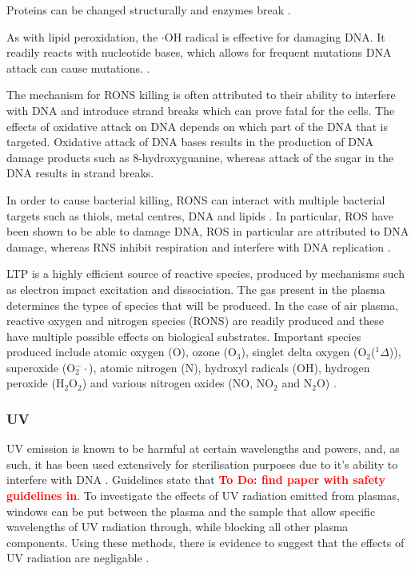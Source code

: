\documentclass[11pt, oneside]{article}   	%
\newcommand{\todo}[1]{ \textcolor{red}{\bf{To Do:} #1}}
\begin{document}
Proteins can be changed structurally and enzymes break \cite{PhamHuy2008free}.

As with lipid peroxidation, the $\cdot$OH radical is effective for damaging DNA. 
It readily reacts with nucleotide bases, which allows for frequent mutations 
DNA attack can cause mutations. \cite{PhamHuy2008free}.


The mechanism for RONS killing is often attributed to their ability to interfere with DNA and introduce strand breaks which can prove fatal for the cells.
The effects of oxidative attack on DNA depends on which part of the DNA that is targeted.
Oxidative attack of DNA bases results in the production of DNA damage products such as 8-hydroxyguanine, whereas attack of the sugar in the DNA results in strand breaks.


In order to cause bacterial killing, RONS can interact with multiple bacterial targets such as thiols, metal centres, DNA and lipids \cite{Fang2004antimicrobial}.
In particular, ROS have been shown to be able to damage DNA, 
ROS in particular are attributed to DNA damage, whereas RNS inhibit respiration and interfere with DNA replication \cite{Fang2004antimicrobial}.

LTP is a highly efficient source of reactive species, produced by mechanisms such as electron impact excitation and dissociation.
The gas present in the plasma determines the types of species that will be produced. 
In the case of air plasma, reactive oxygen and nitrogen species (RONS) are readily produced and these have multiple possible effects on biological substrates.
Important species produced include atomic oxygen (O), ozone (O$_3$), singlet delta oxygen (O$_2$($^1\Delta$)), superoxide (O$_2^-\cdot$), atomic nitrogen (N), hydroxyl radicals (OH), hydrogen peroxide (H$_2$O$_2$) and various nitrogen oxides (NO, NO$_2$ and N$_2$O) \cite{Graves2014low}.


\subsubsection{UV}
UV emission is known to be harmful at certain wavelengths and powers, and, as such, it has been used extensively for sterilisation purposes due to it's ability to interfere with DNA \cite{Laroussi2004evaluation}.
Guidelines state that \todo{find paper with safety guidelines in}.
To investigate the effects of UV radiation emitted from plasmas, windows can be put between the plasma and the sample that allow specific wavelengths of UV radiation through, while blocking all other plasma components. 
Using these methods, there is evidence to suggest that the effects of UV radiation are negligable \cite{Laroussi2004evaluation, Dobrynin2009physical}.
\end{document}
